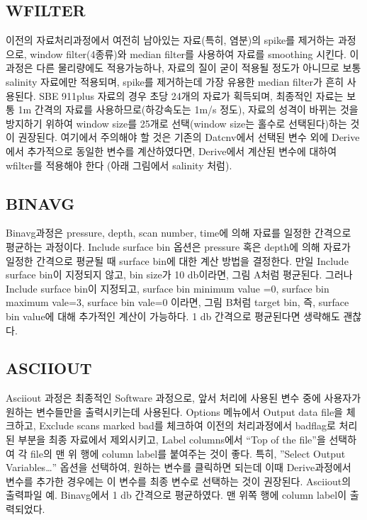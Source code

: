 \documentclass[
]{book}
\begin{document}
\hypertarget{wfilter}{%
\subsection{WFILTER}\label{wfilter}}

이전의 자료처리과정에서 여전히 남아있는 자료(특히, 염분)의 spike를 제거하는 과정으로, window filter(4종류)와 median filter를 사용하여 자료를 smoothing 시킨다.
이 과정은 다른 물리량에도 적용가능하나, 자료의 질이 굳이 적용될 정도가 아니므로 보통 salinity 자료에만 적용되며, spike를 제거하는데 가장 유용한 median filter가 흔히 사용된다. SBE 911plus 자료의 경우 초당 24개의 자료가 획득되며, 최종적인 자료는 보통 1m 간격의 자료를 사용하므로(하강속도는 1m/s 정도), 자료의 성격이 바뀌는 것을 방지하기 위하여 window size를 25개로 선택(window size는 홀수로 선택된다)하는 것이 권장된다. 여기에서 주의해야 할 것은 기존의 Datcnv에서 선택된 변수 외에 Derive에서 추가적으로 동일한 변수를 계산하였다면, Derive에서 계산된 변수에 대하여 wfilter를 적용해야 한다 (아래 그림에서 salinity 처럼).

\hypertarget{binavg}{%
\subsection{BINAVG}\label{binavg}}

Binavg과정은 pressure, depth, scan number, time에 의해 자료를 일정한 간격으로 평균하는 과정이다. Include surface bin 옵션은 pressure 혹은 depth에 의해 자료가 일정한 간격으로 평균될 때 surface bin에 대한 계산 방법을 결정한다. 만일 Include surface bin이 지정되지 않고, bin size가 10 db이라면, 그림 A처럼 평균된다. 그러나 Include surface bin이 지정되고, surface bin minimum value =0, surface bin maximum vale=3, surface bin vale=0 이라면, 그림 B처럼 target bin, 즉, surface bin value에 대해 추가적인 계산이 가능하다. 1 db 간격으로 평균된다면 생략해도 괜찮다.

\hypertarget{asciiout}{%
\subsection{ASCIIOUT}\label{asciiout}}

Asciiout 과정은 최종적인 Software 과정으로, 앞서 처리에 사용된 변수 중에 사용자가 원하는 변수들만을 출력시키는데 사용된다. Options 메뉴에서 Output data file을 체크하고, Exclude scans marked bad를 체크하여 이전의 처리과정에서 badflag로 처리된 부분을 최종 자료에서 제외시키고, Label columns에서 ``Top of the file''을 선택하여 각 file의 맨 위 행에 column label를 붙여주는 것이 좋다. 특히, ''Select Output Variables\ldots'' 옵션을 선택하여, 원하는 변수를 클릭하면 되는데 이때 Derive과정에서 변수를 추가한 경우에는 이 변수를 최종 변수로 선택하는 것이 권장된다.
Asciiout의 출력파일 예. Binavg에서 1 db 간격으로 평균하였다. 맨 위쪽 행에 column label이 출력되었다.
\end{document}
